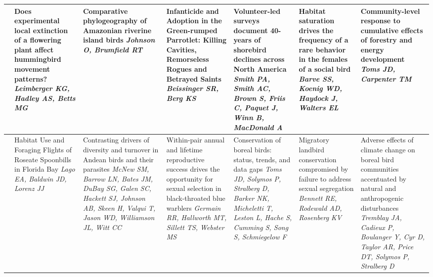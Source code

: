 \begin{tabular}{|x{0.75cm}|x{2.25cm}|x{2.25cm}|x{2.25cm}|a{2.25cm}|a{2.25cm}|a{2.25cm}|}
\hline
{}&Does experimental local extinction of a flowering plant affect hummingbird movement patterns? \newline \newline \textit{Leimberger KG, Hadley AS, Betts MG} & Comparative phylogeography of Amazonian riverine island birds \newline \newline \textit{Johnson O, Brumfield RT} & Infanticide and Adoption in the Green-rumped Parrotlet: Killing Cavities, Remorseless Rogues and Betrayed Saints \newline \newline \textit{Beissinger SR, Berg KS} & Volunteer-led surveys document 40-years of shorebird declines across North America \newline \newline \textit{Smith PA, Smith AC, Brown S, Friis C, Paquet J, Winn B, MacDonald A} & Habitat saturation drives the frequency of a rare behavior in the females of a social bird \newline \newline \textit{Barve SS, Koenig WD, Haydock J, Walters EL} & Community-level response to cumulative effects of forestry and energy development \newline \newline \textit{Toms JD, Carpenter TM}\\
\hline
{}&Habitat Use and Foraging Flights of Roseate Spoonbills in Florida Bay \newline \newline \textit{Lago EA, Baldwin JD, Lorenz JJ} & Contrasting drivers of diversity and turnover in Andean birds and their parasites \newline \newline \textit{McNew SM, Barrow LN, Bates JM, DuBay SG, Galen SC, Hackett SJ, Johnson AB, Skeen H, Valqui T, Jason WD, Williamson JL, Witt CC} & Within-pair annual and lifetime reproductive success drives the opportunity for sexual selection in black-throated blue warblers \newline \newline \textit{Germain RR, Hallworth MT, Sillett TS, Webster MS} & Conservation of boreal birds: status, trends, and data gaps \newline \newline \textit{Toms JD, Solymos P, Stralberg D, Barker NK, Micheletti T, Leston L, Hache S, Cumming S, Song S, Schmiegelow F} & Migratory landbird conservation compromised by failure to address sexual segregation \newline \newline \textit{Bennett RE, Rodewald AD, Rosenberg KV} & Adverse effects of climate change on boreal bird communities accentuated by natural and anthropogenic disturbances \newline \newline \textit{Tremblay JA, Cadieux P, Boulanger Y, Cyr D, Taylor AR, Price DT, Solymos P, Stralberg D}\\

\end{tabular}
